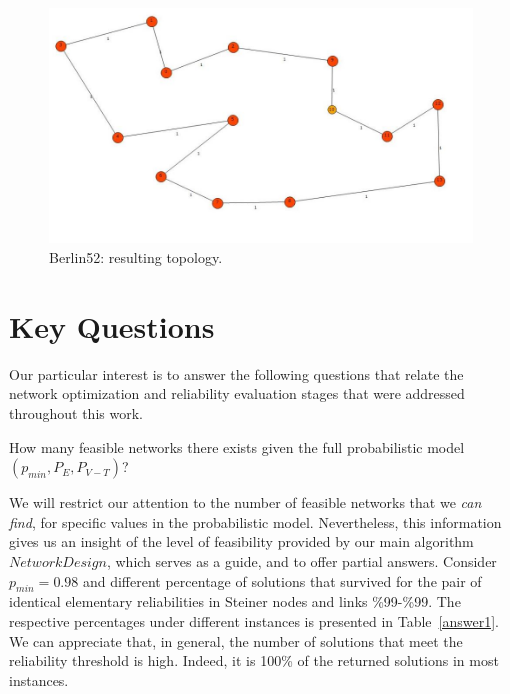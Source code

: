 \begin{figure}[H]
\begin{center}
\includegraphics[scale=0.55]{4.jpg}
\caption{Berlin52: resulting topology.}\label{be2}
\end{center} 
\end{figure}

\clearpage
\section{Key Questions}\label{answers}
Our particular interest is to answer the following questions that relate the network optimization and 
reliability evaluation stages that were addressed throughout this work. 
\begin{question}
How many feasible networks there exists given the full probabilistic model $(p_{min},P_E,P_{V-T})$? 
\end{question}

We will restrict our attention to the number of feasible networks that we \emph{can find}, for specific 
values in the probabilistic model. Nevertheless, this information gives us an insight of the level of feasibility 
provided by our main algorithm $NetworkDesign$, which serves as a guide, and to offer partial answers. 
Consider $p_{min}=0.98$ and different percentage of solutions that survived for the pair 
of identical elementary reliabilities in Steiner nodes and links \%99-\%99. 
The respective percentages under different instances is presented in Table~\ref{answer1}. 
We can appreciate that, in general, the number of solutions that meet the reliability threshold is high. 
Indeed, it is 100\% of the returned solutions in most instances. 

